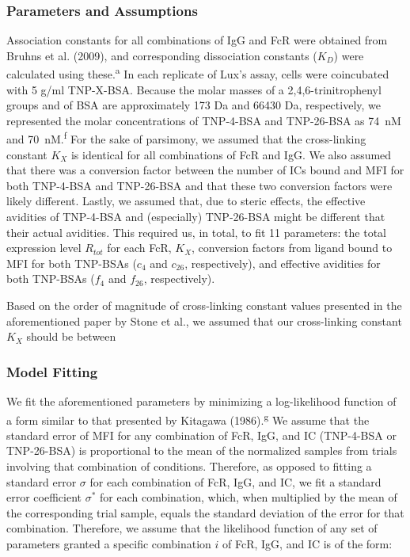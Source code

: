 \subsubsection{Parameters and Assumptions}

Association constants for all combinations of IgG and Fc\textgamma{}R were obtained from Bruhns et al. (2009), and corresponding dissociation constants ($K_D$) were calculated using these.\textsuperscript{a} In each replicate of Lux's assay, cells were coincubated with 5 \textmu{}g/ml TNP-X-BSA. Because the molar masses of a 2,4,6-trinitrophenyl groups and of BSA are approximately 173 Da and 66430 Da, respectively, we represented the molar concentrations of TNP-4-BSA and TNP-26-BSA as 74~nM and 70~nM.\textsuperscript{f} For the sake of parsimony, we assumed that the cross-linking constant $K_X$ is identical for all combinations of Fc\textgamma{}R and IgG. We also assumed that there was a conversion factor between the number of ICs bound and MFI for both TNP-4-BSA and TNP-26-BSA and that these two conversion factors were likely different. Lastly, we assumed that, due to steric effects, the effective avidities of TNP-4-BSA and (especially) TNP-26-BSA might be different that their actual avidities. This required us, in total, to fit 11 parameters: the total expression level $R_{tot}$ for each Fc\textgamma{}R, $K_X$, conversion factors from ligand bound to MFI for both TNP-BSAs ($c_{4}$ and $c_{26}$, respectively), and effective avidities for both TNP-BSAs ($f_{4}$ and $f_{26}$, respectively).

Based on the order of magnitude of cross-linking constant values presented in the aforementioned paper by Stone et al., we assumed that our cross-linking constant $K_X$ should be between 

\subsubsection*{Model Fitting}

We fit the aforementioned parameters by minimizing a log-likelihood function of a form similar to that presented by Kitagawa (1986).\textsuperscript{g} We assume that the standard error of MFI for any combination of Fc\textgamma{}R, IgG, and IC (TNP-4-BSA or TNP-26-BSA) is proportional to the mean of the normalized samples from trials involving that combination of conditions. Therefore, as opposed to fitting a standard error $\sigma$ for each combination of Fc\textgamma{}R, IgG, and IC, we fit a standard error coefficient $\sigma^*$ for each combination, which, when multiplied by the mean of the corresponding trial sample, equals the standard deviation of the error for that combination. Therefore, we assume that the likelihood function of any set of parameters granted a specific combination $i$ of Fc\textgamma{}R, IgG, and IC is of the form:

